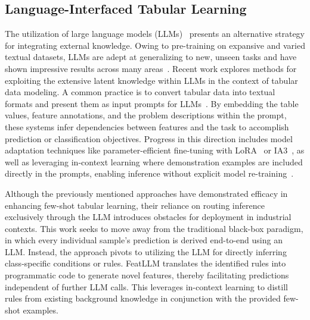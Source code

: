 \subsection{Language-Interfaced Tabular Learning} The utilization of large language models (LLMs)~\cite{anil2023palm,openai2023gpt4} presents an alternative strategy for integrating external knowledge. Owing to pre-training on expansive and varied textual datasets, LLMs are adept at generalizing to new, unseen tasks and have shown impressive results across many areas~\cite{brown2020language}. Recent work explores methods for exploiting the extensive latent knowledge within LLMs in the context of tabular data modeling. A common practice is to convert tabular data into textual formats and present them as input prompts for LLMs~\cite{dinh2022lift,hegselmann2023tabllm,wang2023anypredict}. By embedding the table values, feature annotations, and the problem descriptions within the prompt, these systems infer dependencies between features and the task to accomplish prediction or classification objectives. Progress in this direction includes model adaptation techniques like parameter-efficient fine-tuning with LoRA~\cite{hu2021lora} or IA3~\cite{liu2022few}, as well as leveraging in-context learning where demonstration examples are included directly in the prompts, enabling inference without explicit model re-training~\cite{dinh2022lift,hegselmann2023tabllm,nam2023semi,slack2023tablet}.

Although the previously mentioned approaches have demonstrated efficacy in enhancing few-shot tabular learning, their reliance on routing inference exclusively through the LLM introduces obstacles for deployment in industrial contexts. This work seeks to move away from the traditional black-box paradigm, in which every individual sample’s prediction is derived end-to-end using an LLM. Instead, the approach pivots to utilizing the LLM for directly inferring class-specific conditions or rules. \textsf{FeatLLM} translates the identified rules into programmatic code to generate novel features, thereby facilitating predictions independent of further LLM calls. This leverages in-context learning to distill rules from existing background knowledge in conjunction with the provided few-shot examples.

